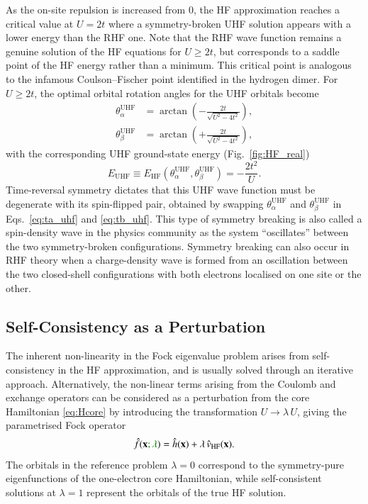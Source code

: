 \documentclass[aps,prb,reprint,noshowkeys,linenumbers,superscriptaddress]{revtex4-1}
\newcommand{\hugh}[1]{\textcolor{hughgreen}{#1}}
\newcommand{\ta}{\theta_{\alpha}}
\newcommand{\tb}{\theta_{\beta}}
\begin{document}
As the on-site repulsion is increased from 0, the HF approximation reaches a critical value at $U=2t$ where a symmetry-broken 
UHF solution appears with a lower energy than the RHF one.
Note that the RHF wave function remains a genuine solution of the HF equations for $U \ge 2t$, but corresponds to a saddle point 
of the HF energy rather than a minimum.
This critical point is analogous to the infamous Coulson--Fischer point identified in the hydrogen dimer.\cite{Coulson_1949}
For $U \ge 2t$, the optimal orbital rotation angles for the UHF orbitals become
\begin{align}
    \ta^\text{UHF} & = \arctan (-\frac{2t}{\sqrt{U^2 - 4t^2}}),
    \label{eq:ta_uhf}
	\\
    \tb^\text{UHF} & = \arctan (+\frac{2t}{\sqrt{U^2 - 4t^2}}),
    \label{eq:tb_uhf}
\end{align}
with the corresponding UHF ground-state energy (Fig.~\ref{fig:HF_real})
\begin{equation}
	E_\text{UHF} \equiv E_\text{HF}(\ta^\text{UHF}, \tb^\text{UHF}) = - \frac{2t^2}{U}.
\end{equation}
Time-reversal symmetry dictates that this UHF wave function must be degenerate with its spin-flipped pair, obtained 
by swapping $\ta^{\text{UHF}}$ and $\tb^{\text{UHF}}$ in Eqs.~\eqref{eq:ta_uhf} and \eqref{eq:tb_uhf}.
This type of symmetry breaking is also called a spin-density wave in the physics community as the system
``oscillates'' between the two symmetry-broken configurations. \cite{GiulianiBook}
\hugh{Symmetry breaking can also occur in RHF theory when a charge-density wave is formed from an oscillation 
between the two closed-shell configurations with both electrons localised on one site or the other.\cite{StuberPaldus,Fukutome_1981}}

\subsection{Self-Consistency as a Perturbation} %

The inherent non-linearity in the Fock eigenvalue problem arises from self-consistency 
in the HF approximation, and is usually solved through an iterative approach.\cite{Roothaan1951,Hall1951}
Alternatively, the non-linear terms arising from the Coulomb and exchange operators can 
be considered as a perturbation from the core Hamiltonian \eqref{eq:Hcore} by introducing the
transformation $U \rightarrow \lambda\, U$, giving the parametrised Fock operator 
\begin{equation}
    \Hat{f}(\vb{x} \hugh{; \lambda}) = \Hat{h}(\vb{x}) + \lambda\, \Hat{v}_\text{HF}(\vb{x}).
\end{equation}
The orbitals in the reference problem $\lambda=0$ correspond to the symmetry-pure eigenfunctions of the one-electron core
Hamiltonian, while self-consistent solutions at $\lambda = 1$ represent the orbitals of the true HF solution.
\end{document}
